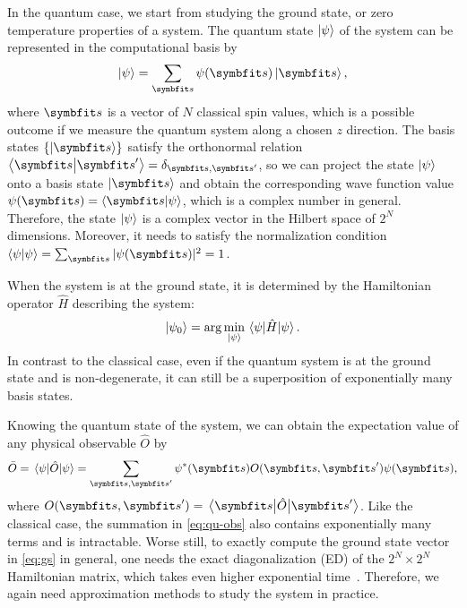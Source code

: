 In the quantum case, we start from studying the ground state, or zero temperature properties of a system. The quantum state $\ket{\psi}$ of the system can be represented in the computational basis by
\begin{equation}
\ket{\psi} = \sum_\vs \psi(\vs) \ket{\vs},
\end{equation}
where $\vs$ is a vector of $N$ classical spin values, which is a possible outcome if we measure the quantum system along a chosen $z$ direction. The basis states $\{\ket{\vs}\}$ satisfy the orthonormal relation $\ip{\vs}{\vs'} = \delta_{\vs, \vs'}$, so we can project the state $\ket{\psi}$ onto a basis state $\ket{\vs}$ and obtain the corresponding wave function value $\psi(\vs) = \ip{\vs}{\psi}$, which is a complex number in general. Therefore, the state $\ket{\psi}$ is a complex vector in the Hilbert space of $2^N$ dimensions. Moreover, it needs to satisfy the normalization condition $\ip{\psi}{\psi} = \sum_\vs |\psi(\vs)|^2 = 1$.

When the system is at the ground state, it is determined by the Hamiltonian operator $\hat{H}$ describing the system:
\begin{equation}
\ket{\psi_0} = \arg\min_{\ket{\psi}} \ev{\hat{H}}{\psi}.
\label{eq:gs}
\end{equation}
In contrast to the classical case, even if the quantum system is at the ground state and is non-degenerate, it can still be a superposition of exponentially many basis states.

Knowing the quantum state of the system, we can obtain the expectation value of any physical observable $\hat{O}$ by
\begin{equation}
\bar{O} = \ev{\hat{O}}{\psi} = \sum_{\vs, \vs'} \psi^*(\vs) O(\vs, \vs') \psi(\vs),
\label{eq:qu-obs}
\end{equation}
where $O(\vs, \vs') = \mel{\vs}{\hat{O}}{\vs'}$. Like the classical case, the summation in \cref{eq:qu-obs} also contains exponentially many terms and is intractable. Worse still, to exactly compute the ground state vector in \cref{eq:gs} in general, one needs the exact diagonalization (ED) of the $2^N \times 2^N$ Hamiltonian matrix, which takes even higher exponential time~\cite{weisse2008exact}. Therefore, we again need approximation methods to study the system in practice.

